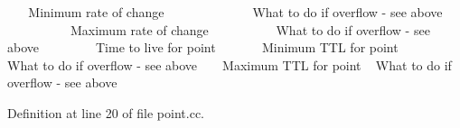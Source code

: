 ~\newline
~\newline
 Minimum rate of change ~\newline
~\newline
~\newline
~\newline
~\newline
~\newline
~\newline
~\newline
 What to do if overflow -\/ see above ~\newline
~\newline
~\newline
~\newline
~\newline
~\newline
~\newline
 Maximum rate of change ~\newline
~\newline
~\newline
~\newline
~\newline
~\newline
 What to do if overflow -\/ see above ~\newline
~\newline
~\newline
~\newline
~\newline
 Time to live for point ~\newline
~\newline
~\newline
~\newline
 Minimum T\+TL for point ~\newline
~\newline
~\newline
 What to do if overflow -\/ see above ~\newline
~\newline
 Maximum T\+TL for point ~\newline
 What to do if overflow -\/ see above 

Definition at line 20 of file point.\+cc.

